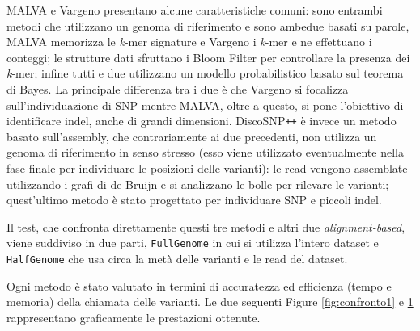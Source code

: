 \documentclass[../main.tex]{subfiles}
\begin{document}
MALVA e Vargeno presentano alcune caratteristiche comuni: sono entrambi metodi che utilizzano un genoma di riferimento e sono ambedue basati su parole, MALVA memorizza le \textit{k}-mer signature e Vargeno i \textit{k}-mer e ne effettuano i conteggi; le strutture dati sfruttano i Bloom Filter per controllare la presenza dei \textit{k}-mer; infine tutti e due utilizzano un modello probabilistico basato sul teorema di Bayes. La principale differenza tra i due è che Vargeno si focalizza sull'individuazione di SNP mentre MALVA, oltre a questo, si pone l'obiettivo di identificare indel, anche di grandi dimensioni. DiscoSNP\texttt{++} è invece un metodo basato sull'assembly, che contrariamente ai due precedenti, non utilizza un genoma di riferimento in senso stresso (esso viene utilizzato eventualmente nella fase finale per individuare le posizioni delle varianti): le read vengono assemblate utilizzando i grafi di de Bruijn e si analizzano le bolle per rilevare le varianti; quest'ultimo metodo è stato progettato per individuare SNP e piccoli indel.

Il test, che confronta direttamente questi tre metodi e altri due \textit{alignment-based}, viene suddiviso in due parti, \texttt{FullGenome} in cui si utilizza l'intero dataset e \texttt{HalfGenome} che usa circa la metà delle varianti e le read del dataset.

Ogni metodo è stato valutato in termini di accuratezza ed efficienza (tempo e memoria) della chiamata delle varianti. Le due seguenti Figure \ref{fig:confronto1} e \ref{fig:confronto2} rappresentano graficamente le prestazioni ottenute.

\begin{figure}[h!]
\centering
\begin{minipage}{.5\textwidth}
  \centering
  \captionsetup{justification=centering}
  \vspace*{0,9cm}
  \label{fig:confronto1}
\end{minipage}%
\begin{minipage}{.5\textwidth}
  \centering
  \captionsetup{justification=centering}
  \label{fig:confronto2}
\end{minipage}
\end{figure}
\end{document}
